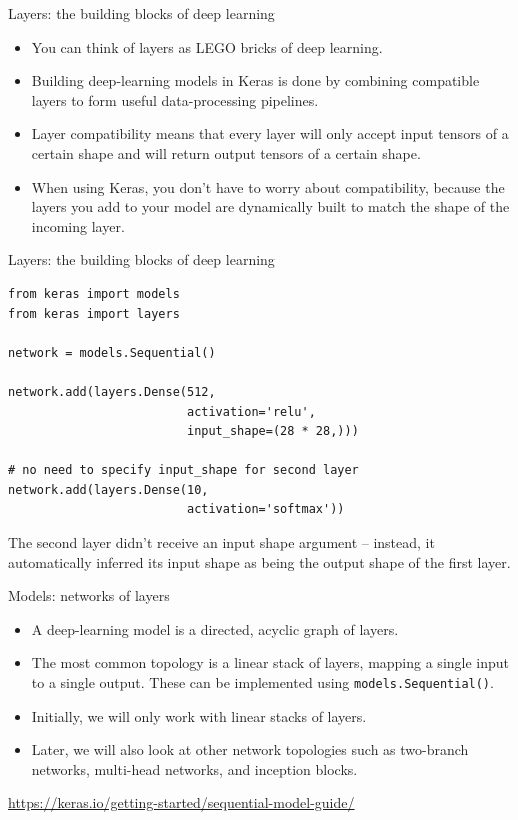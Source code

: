 \documentclass{beamer}
\begin{document}
\begin{frame}{Layers: the building blocks of deep learning}

\begin{itemize}
\item You can think of layers as LEGO bricks of deep learning.
\item Building deep-learning models in Keras is done by combining compatible layers to form useful data-processing pipelines.
\item Layer compatibility means that every layer will only accept input tensors of a certain shape and will return output tensors of a certain shape.
\item When using Keras, you don't have to worry about compatibility, because the layers you add to your model are dynamically built to match the shape of the incoming layer.
\end{itemize}
\end{frame}

\begin{frame}[fragile]{Layers: the building blocks of deep learning}
\begin{lstlisting}
from keras import models
from keras import layers

network = models.Sequential()

network.add(layers.Dense(512,
                         activation='relu',
                         input_shape=(28 * 28,)))

# no need to specify input_shape for second layer
network.add(layers.Dense(10,
                         activation='softmax')) 
\end{lstlisting}
The second layer didn't receive an input shape argument -- instead, it automatically inferred its input shape as being the output shape of the first layer.
\end{frame}

\begin{frame}{Models: networks of layers}
\begin{itemize}
\item A deep-learning model is a directed, acyclic graph of layers. 
\item The most common topology is a linear stack of layers, mapping a single input to a single output. These can be implemented using \texttt{models.Sequential()}.
\item Initially, we will only work with linear stacks of layers. 
\item Later, we will also look at other network topologies such as two-branch networks, multi-head networks, and inception blocks.
\end{itemize}
{\small \url{https://keras.io/getting-started/sequential-model-guide/}}
\end{frame}
\end{document}
